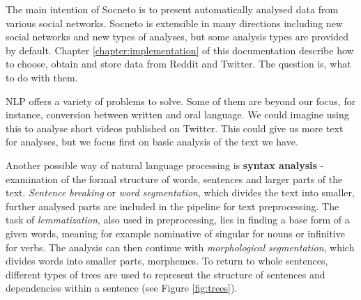 The main intention of Socneto is to present automatically analysed data from various social networks. Socneto is extensible in many directions including new social networks and new types of analyses, but some analysis types are provided by default. Chapter \ref{chapter:implementation} of this documentation describe how to choose, obtain and store data from Reddit and Twitter. The question is, what to do with them. \par
NLP offers a variety of problems to solve. Some of them are  beyond our focus, for instance, conversion between written and oral language. We could imagine using this to analyse short videos published on Twitter. This could give us more text for analyses, but we  focus first on  basic analysis of the text we have.\par Another possible way of natural language processing is \textbf{syntax analysis} - examination of the formal structure of words, sentences and larger parts of the text. \textit{Sentence breaking} or \textit{word segmentation}, which divides the text into smaller, further analysed parts are included in the pipeline for text preprocessing. The task of \textit{lemmatization}, also used in preprocessing, lies in finding a base form of a given words, meaning for example nominative of singular for nouns or infinitive for verbs. The analysis can then continue with \textit{morphological segmentation}, which divides words into smaller parts, morphemes. To return to whole sentences, different types of trees are used to represent the structure of sentences and dependencies within a sentence (see Figure \ref{fig:trees}).
